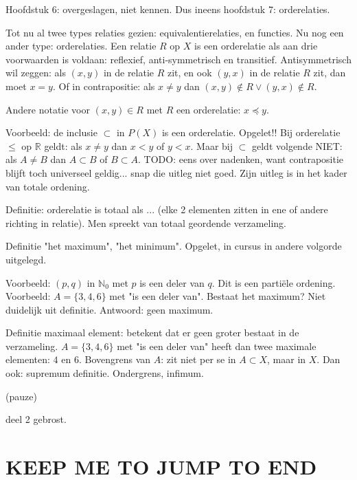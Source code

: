 \documentclass{article}
\begin{document}
Hoofdstuk 6: overgeslagen, niet kennen. Dus ineens hoofdstuk 7: orderelaties. 

Tot nu al twee types relaties gezien: equivalentierelaties, en functies. Nu nog een ander type: orderelaties. Een relatie $R$ op $X$ is een orderelatie als aan drie voorwaarden is voldaan: reflexief, anti-symmetrisch en transitief. Antisymmetrisch wil zeggen: als $(x,y)$ in de relatie $R$ zit, en ook $(y,x)$ in de relatie $R$ zit, dan moet $x=y$. Of in contrapositie: als $x \neq y$ dan $(x,y) \notin R \lor (y,x) \notin R$. 

Andere notatie voor $(x,y) \in  R$ met $R$ een orderelatie: $x \preceq y$. 

Voorbeeld: de inclusie $\subset$ in $P(X)$ is een orderelatie. Opgelet!! Bij orderelatie $\leq$ op $\mathbb{R}$ geldt: als $x \neq y$ dan $x < y$ of $y < x$. Maar bij $\subset$ geldt volgende NIET: als $A \neq B$ dan $A \subset B$ of $B \subset A$. TODO: eens over nadenken, want contrapositie blijft toch universeel geldig... snap die uitleg niet goed. Zijn uitleg is in het kader van totale ordening. 

Definitie: orderelatie is totaal als ... (elke 2 elementen zitten in ene of andere richting in relatie). Men spreekt van totaal geordende verzameling. 

Definitie "het maximum", "het minimum". Opgelet, in cursus in andere volgorde uitgelegd. 

Voorbeeld: $(p,q)$ in $\mathbb{N}_0$ met $p$ is een deler van $q$. Dit is een parti\"ele ordening. Voorbeeld: $A=\{3,4,6\}$ met "is een deler van". Bestaat het maximum? Niet duidelijk uit definitie. Antwoord: geen maximum. 

Definitie maximaal element: betekent dat er geen groter bestaat in de verzameling. 
$A=\{3,4,6\}$ met "is een deler van" heeft dan twee maximale elementen: $4$ en $6$. 
Bovengrens van $A$: zit niet per se in $A \subset X$, maar in $X$. Dan ook: supremum definitie. Ondergrens, infimum. 

(pauze)

deel 2 gebrost. 

\section{KEEP ME TO JUMP TO END}
\end{document}
